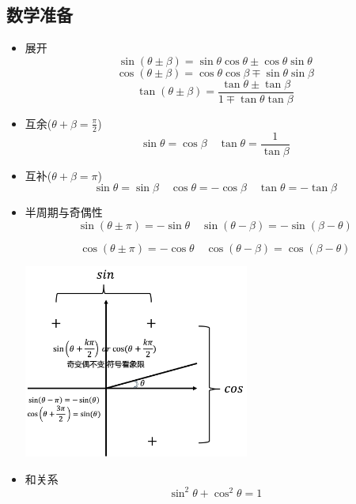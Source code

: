 \documentclass{article}
\begin{document}
\vspace{2em}


\subsection{数学准备}
\begin{formal}
    \begin{itemize}
        \item 展开
              $$ \sin{(\theta \pm \beta)} = \sin{\theta}\cos{\theta} \pm \cos{\theta}\sin{\theta} $$
              $$ \cos{(\theta \pm \beta)} = \cos{\theta}\cos{\beta} \mp \sin{\theta}\sin{\beta} $$
              $$ \tan{(\theta \pm \beta)} = \dfrac{\tan{\theta} \pm \tan{\beta}}{1 \mp \tan{\theta}\tan{\beta}}$$

        \item 互余($\theta + \beta = \frac{\pi}{2}$)
              $$
                \sin{\theta} = \cos{\beta}  \quad   \tan{\theta} = \frac{1}{\tan{\beta}}
              $$

        \item 互补($\theta + \beta = \pi$)
              $$
                  \sin{\theta} = \sin{\beta} \quad \cos{\theta} = - \cos{\beta}
                  \quad \tan{\theta} = - \tan{\beta}
              $$
        \item 半周期与奇偶性
             $$
             \sin{(\theta \pm \pi)} = -\sin{\theta}   \quad   \sin{(\theta - \beta)} = - \sin{(\beta - \theta)}
             $$

             $$
             \cos{(\theta \pm \pi)} = -\cos{\theta}   \quad   \cos{(\theta - \beta)} =  \cos{(\beta - \theta)}
             $$

              \includegraphics[width = 20em]{./pictures/1.png}

        \item 和关系
              $$ \sin^{2}{\theta}+\cos^{2}{\theta} = 1$$


\end{itemize}
\end{formal}
\end{document}
